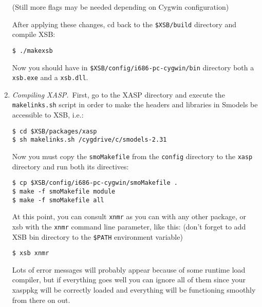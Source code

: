 \begin{enumerate}
(Still more flags may be needed depending on Cygwin configuration)

After applying these changes, cd back to the {\tt \$XSB/build}
directory and compile XSB:
%
\begin{verbatim}
$ ./makexsb
\end{verbatim}
%
Now you should have in {\tt \$XSB/config/i686-pc-cygwin/bin} directory
both a {\tt xsb.exe} and a {\tt xsb.dll}. 

\item{\em Compiling XASP.}\ 
First, go to the XASP directory and execute the {\tt makelinks.sh}
script in order to make the headers and libraries in Smodels be
accessible to XSB, i.e.:
%
\begin{verbatim}
$ cd $XSB/packages/xasp
$ sh makelinks.sh /cygdrive/c/smodels-2.31
\end{verbatim}
%
Now you must copy the {\tt smoMakefile} from the {\tt config}
directory to the {\tt xasp} directory and run both its directives:
%
\begin{verbatim}
$ cp $XSB/config/i686-pc-cygwin/smoMakefile .
$ make -f smoMakefile module
$ make -f smoMakefile all
\end{verbatim}
%
At this point, you can consult {\tt xnmr} as you can with any other
package, or xsb with the {\tt xnmr} command line parameter, like this:
(don't forget to add XSB bin directory to the {\tt \$PATH} environment
variable)
%
\begin{verbatim}
$ xsb xnmr
\end{verbatim}
%
Lots of error messages will probably appear because of some runtime
load compiler, but if everything goes well you can ignore all of them
since your xasppkg will be correctly loaded and everything will be
functioning smoothly from there on out.
\end{enumerate}


